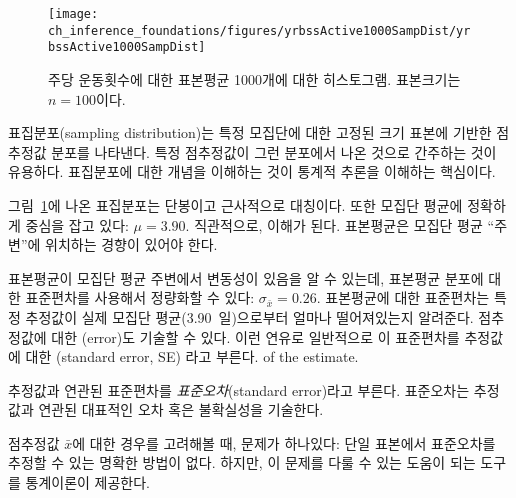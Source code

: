 \begin{figure}[h]
   \centering
   \texttt{[image: ch\_inference\_foundations/figures/yrbssActive1000SampDist/yrbssActive1000SampDist]}
   \caption{주당 운동횟수에 대한 표본평균 1000개에 대한 히스토그램. 표본크기는 $n=100$이다.}
   \label{yrbssActive1000SampDist}
\end{figure}

\begin{termBox}{
표집분포(sampling distribution)는 특정 모집단에 대한 고정된 크기 표본에 기반한 점추정값 분포를 나타낸다. 특정 점추정값이 그런 분포에서 나온 것으로 간주하는 것이 유용하다. 표집분포에 대한 개념을 이해하는 것이 통계적 추론을 이해하는 핵심이다.}
\end{termBox}

그림~\ref{yrbssActive1000SampDist}에 나온 표집분포는 단봉이고 근사적으로 대칭이다. 또한 모집단 평균에 정확하게 중심을 잡고 있다: $\mu=3.90$. 직관적으로, 이해가 된다. 표본평균은 모집단 평균 ``주변''에 위치하는 경향이 있어야 한다.

표본평균이 모집단 평균 주변에서 변동성이 있음을 알 수 있는데, 표본평균 분포에 대한 표준편차를 사용해서 정량화할 수 있다: $\sigma_{\bar{x}} = 0.26$. 표본평균에 대한 표준편차는 특정 추정값이 실제 모집단 평균(3.90~일)으로부터 얼마나 떨어져있는지 알려준다. 점추정값에 대한 (error)도 기술할 수 있다. 이런 연유로 일반적으로 이 표준편차를 추정값에 대한 (standard error, SE) 라고 부른다. of the estimate.

\begin{termBox}{
추정값과 연관된 표준편차를 \emph{표준오차}(standard error)라고 부른다. 표준오차는 추정값과 연관된 대표적인 오차 혹은 불확실성을 기술한다.}
\end{termBox}

점추정값 $\bar{x}$에 대한 경우를 고려해볼 때, 문제가 하나있다: 단일 표본에서 표준오차를 추정할 수 있는 명확한 방법이 없다. 하지만, 이 문제를 다룰 수 있는 도움이 되는 도구를 통계이론이 제공한다.


